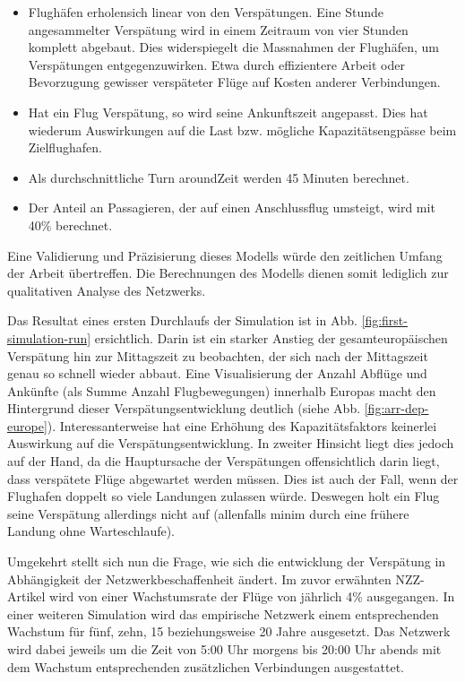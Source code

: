 \begin{itemize}
    \item Flughäfen \guillemotleft erholen\guillemotright sich linear von den Verspätungen. Eine Stunde angesammelter Verspätung wird in einem Zeitraum von vier Stunden komplett abgebaut. Dies widerspiegelt die Massnahmen der Flughäfen, um Verspätungen entgegenzuwirken. Etwa durch effizientere Arbeit oder Bevorzugung gewisser verspäteter Flüge auf Kosten anderer Verbindungen.
    \item Hat ein Flug Verspätung, so wird seine Ankunftszeit angepasst. Dies hat wiederum Auswirkungen auf die Last bzw. mögliche Kapazitätsengpässe beim Zielflughafen.
    \item Als durchschnittliche \guillemotleft Turn around\guillemotright Zeit werden 45 Minuten berechnet.
    \item Der Anteil an Passagieren, der auf einen Anschlussflug umsteigt, wird mit 40\% berechnet.
\end{itemize}

Eine Validierung und Präzisierung dieses Modells würde den zeitlichen Umfang der Arbeit übertreffen.
Die Berechnungen des Modells dienen somit lediglich zur qualitativen Analyse des Netzwerks.

Das Resultat eines ersten Durchlaufs der Simulation ist in Abb. \ref{fig:first-simulation-run} ersichtlich.
Darin ist ein starker Anstieg der gesamteuropäischen Verspätung hin zur Mittagszeit zu beobachten, der sich nach der
Mittagszeit genau so schnell wieder abbaut.
Eine Visualisierung der Anzahl Abflüge und Ankünfte (als Summe Anzahl Flugbewegungen) innerhalb Europas macht den
Hintergrund dieser Verspätungsentwicklung deutlich (siehe Abb. \ref{fig:arr-dep-europe}).
Interessanterweise hat eine Erhöhung des Kapazitätsfaktors keinerlei Auswirkung auf die Verspätungsentwicklung.
In zweiter Hinsicht liegt dies jedoch auf der Hand, da die Hauptursache der Verspätungen offensichtlich darin liegt, dass
verspätete Flüge abgewartet werden müssen.
Dies ist auch der Fall, wenn der Flughafen doppelt so viele Landungen zulassen würde.
Deswegen holt ein Flug seine Verspätung allerdings nicht auf (allenfalls minim durch eine frühere Landung ohne Warteschlaufe).

Umgekehrt stellt sich nun die Frage, wie sich die entwicklung der Verspätung in Abhängigkeit der Netzwerkbeschaffenheit ändert.
Im zuvor erwähnten NZZ-Artikel wird von einer Wachstumsrate der Flüge von jährlich 4\% ausgegangen.
In einer weiteren Simulation wird das empirische Netzwerk einem entsprechenden Wachstum für fünf, zehn, 15 beziehungsweise 20 Jahre ausgesetzt.
Das Netzwerk wird dabei jeweils um die Zeit von 5:00 Uhr morgens bis 20:00 Uhr abends mit dem Wachstum entsprechenden zusätzlichen Verbindungen ausgestattet.

